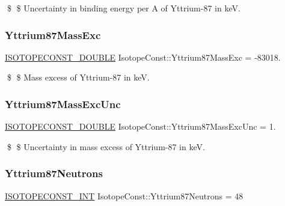 \$ \$ Uncertainty in binding energy per A of Yttrium-\/87 in keV. \mbox{\label{group___isotope_const-_yttrium-_y87_gace25ff7e69ac89512ded47d88c533e2d}} 
\subsubsection{\texorpdfstring{Yttrium87\+Mass\+Exc}{Yttrium87MassExc}}
{\footnotesize\ttfamily \mbox{\hyperlink{group___isotope_const-_macros_ga8f45a7272ce02c0b4c65c44636ed719a}{I\+S\+O\+T\+O\+P\+E\+C\+O\+N\+S\+T\+\_\+\+D\+O\+U\+B\+LE}} Isotope\+Const\+::\+Yttrium87\+Mass\+Exc = -\/83018.}

\$ \$ Mass excess of Yttrium-\/87 in keV. \mbox{\label{group___isotope_const-_yttrium-_y87_gab3e79548bb84c2787743417028ed5b22}} 
\subsubsection{\texorpdfstring{Yttrium87\+Mass\+Exc\+Unc}{Yttrium87MassExcUnc}}
{\footnotesize\ttfamily \mbox{\hyperlink{group___isotope_const-_macros_ga8f45a7272ce02c0b4c65c44636ed719a}{I\+S\+O\+T\+O\+P\+E\+C\+O\+N\+S\+T\+\_\+\+D\+O\+U\+B\+LE}} Isotope\+Const\+::\+Yttrium87\+Mass\+Exc\+Unc = 1.}

\$ \$ Uncertainty in mass excess of Yttrium-\/87 in keV. \mbox{\label{group___isotope_const-_yttrium-_y87_ga4b79c914608779c208103b477aa1ef7c}} 
\subsubsection{\texorpdfstring{Yttrium87\+Neutrons}{Yttrium87Neutrons}}
{\footnotesize\ttfamily \mbox{\hyperlink{group___isotope_const-_macros_ga5f18360b3e99483a35c32d789e62621c}{I\+S\+O\+T\+O\+P\+E\+C\+O\+N\+S\+T\+\_\+\+I\+NT}} Isotope\+Const\+::\+Yttrium87\+Neutrons = 48}

